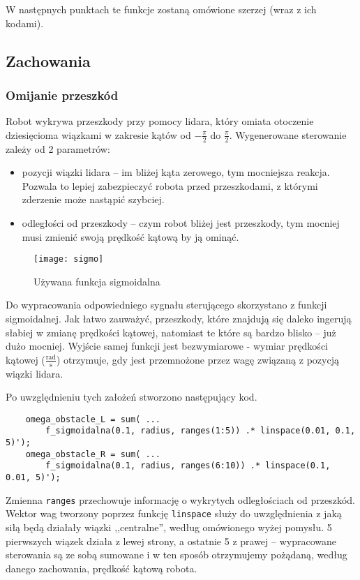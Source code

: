 \documentclass[11pt]{article}
\begin{document}
W następnych punktach te funkcje zostaną omówione szerzej (wraz z ich kodami).

\subsection{Zachowania}

\subsubsection*{Omijanie przeszkód}

Robot wykrywa przeszkody przy pomocy lidara, który omiata otoczenie dziesięcioma wiązkami w zakresie kątów od $-\frac{\pi}{2}$ do $\frac{\pi}{2}$. Wygenerowane sterowanie zależy od 2 parametrów:
\begin{itemize}[--]
\item pozycji wiązki lidara -- im bliżej kąta zerowego, tym mocniejsza reakcja. Pozwala to lepiej zabezpieczyć robota przed przeszkodami, z którymi zderzenie może nastąpić szybciej.
\item odległości od przeszkody -- czym robot bliżej jest przeszkody, tym mocniej musi zmienić swoją prędkość kątową by ją ominąć.
\end{itemize}

\begin{figure}[h!]
	\centering
	\texttt{[image: sigmo]}
	\caption{Używana funkcja sigmoidalna}
\end{figure}

Do wypracowania odpowiedniego sygnału sterującego skorzystano z funkcji sigmoidalnej. Jak łatwo zauważyć, przeszkody, które znajdują się daleko ingerują słabiej w zmianę prędkości kątowej, natomiast te które są bardzo blisko -- już dużo mocniej. Wyjście samej funkcji jest bezwymiarowe - wymiar prędkości kątowej ($\frac{\text{rad}}{\text{s}}$) otrzymuje, gdy jest przemnożone przez wagę związaną z pozycją wiązki lidara.

Po uwzględnieniu tych założeń stworzono następujący kod.
\begin{lstlisting}[firstnumber = 73]
    % Prędkości obu kół wynikające z przeszkód.
    omega_obstacle_L = sum( ...
        f_sigmoidalna(0.1, radius, ranges(1:5)) .* linspace(0.01, 0.1, 5)');
    omega_obstacle_R = sum( ...
        f_sigmoidalna(0.1, radius, ranges(6:10)) .* linspace(0.1, 0.01, 5)');
\end{lstlisting}

Zmienna \texttt{ranges} przechowuje informację o wykrytych odległościach od przeszkód. Wektor wag tworzony poprzez funkcję \texttt{linspace} służy do uwzględnienia z jaką siłą będą działały wiązki ,,centralne'', według omówionego wyżej pomysłu. 5 pierwszych wiązek działa z lewej strony, a ostatnie 5 z prawej -- wypracowane sterowania są ze sobą sumowane i w ten sposób otrzymujemy pożądaną, według danego zachowania, prędkość kątową robota.
\end{document}
